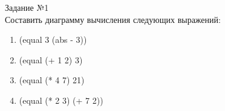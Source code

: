 {\LARGE Задание №1}\\

Составить диаграмму вычисления следующих выражений:
\begin{enumerate}
\item (equal 3 (abs - 3))
\begin{figure}[ht!]
\end{figure}
\item (equal (+ 1 2) 3)
\begin{figure}[ht!]
\end{figure}
\newpage
\item (equal (* 4 7) 21)
\begin{figure}[ht!]
\end{figure}
\item (equal (* 2 3) (+ 7 2))

\end{enumerate}
